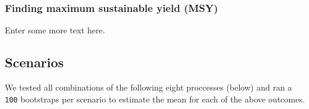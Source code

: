 \documentclass[]{article}
\begin{document}
\hypertarget{finding-maximum-sustainable-yield-msy}{%
\subsubsection{Finding maximum sustainable yield
(MSY)}\label{finding-maximum-sustainable-yield-msy}}

Enter some more text here.

\hypertarget{scenarios}{%
\subsection{Scenarios}\label{scenarios}}

We tested all combinations of the following eight proccesses (below) and
ran a \texttt{100} bootstraps per scenario to estimate the mean for each
of the above outcomes.
\end{document}
